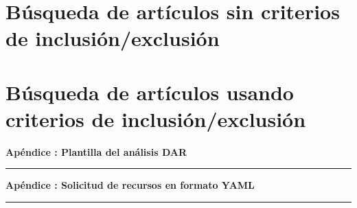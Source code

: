 \section{Búsqueda de artículos sin criterios de inclusión/exclusión}\label{sec:busqueda-sin-criterios}


\FloatBarrier\section{Búsqueda de artículos usando criterios de inclusión/exclusión}\label{sec:busqueda-con-criterios}



\FloatBarrier
\cleardoublepage
{}
{}

\vspace{40pt}
{\centering \normalfont\huge\bfseries Apéndice \thechapter: Plantilla del análisis DAR \par}
\vspace{10pt}
{\centering \rule{\textwidth}{0.4pt} \par}
\vspace{40pt}

\label{apendice:plantilla-dar}






\FloatBarrier
\cleardoublepage
{}
{}

\vspace{40pt}
{\centering \normalfont\huge\bfseries Apéndice \thechapter: Solicitud de recursos en formato YAML \par}
\vspace{10pt}
{\centering \rule{\textwidth}{0.4pt} \par}
\vspace{40pt}

\label{apendice:solicitud-recursos-yaml}

